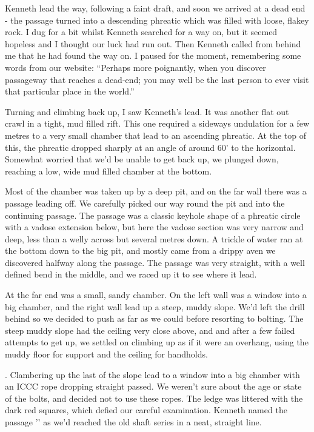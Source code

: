 Kenneth lead the way, following a faint draft, and soon we arrived at a dead end - the passage turned into a descending phreatic which was filled with loose, flakey rock. I dug for a bit whilst Kenneth searched for a way on, but it seemed hopeless and I thought our luck had run out. Then Kenneth called from behind me that he had found the way on. I paused for the moment, remembering some words from our website: “Perhaps more poignantly, when you discover passageway that reaches a dead-end; you may well be the last person to ever visit that particular place in the world.”
 
Turning and climbing back up, I saw Kenneth’s lead. It was another flat out crawl in a tight, mud filled rift. This one required a sideways undulation for a few metres to a very small chamber that lead to an ascending phreatic. At the top of this, the phreatic dropped sharply at an angle of around 60’ to the horizontal. Somewhat worried that we’d be unable to get back up, we plunged down, reaching a low, wide mud filled chamber at the bottom.
 
Most of the chamber was taken up by a deep pit, and on the far wall there was a passage leading off. We carefully picked our way round the pit and into the continuing passage. The passage was a classic keyhole shape of a phreatic circle with a vadose extension below, but here the vadose section was very narrow and deep, less than a welly across but several metres down. A trickle of water ran at the bottom down to the big pit, and mostly came from a drippy aven we discovered halfway along the passage. The passage was very straight, with a well defined bend in the middle, and we raced up it to see where it lead.
 
At the far end was a small, sandy chamber. On the left wall was a window into a big chamber, and the right wall lead up a steep, muddy slope. We’d left the drill behind so we decided to push as far as we could before resorting to bolting. The steep muddy slope had the ceiling very close above, and and after a few failed attempts to get up, we settled on climbing up as if it were an overhang, using the muddy floor for support and the ceiling for handholds.
 
. Clambering up the last of the slope lead to a window into a big chamber with an ICCC rope dropping straight passed. We weren’t sure about the age or state of the bolts, and decided not to use these ropes. The ledge was littered with the dark red squares, which defied our careful examination. Kenneth named the passage '' as we’d reached the old shaft series in a neat, straight line.
 
